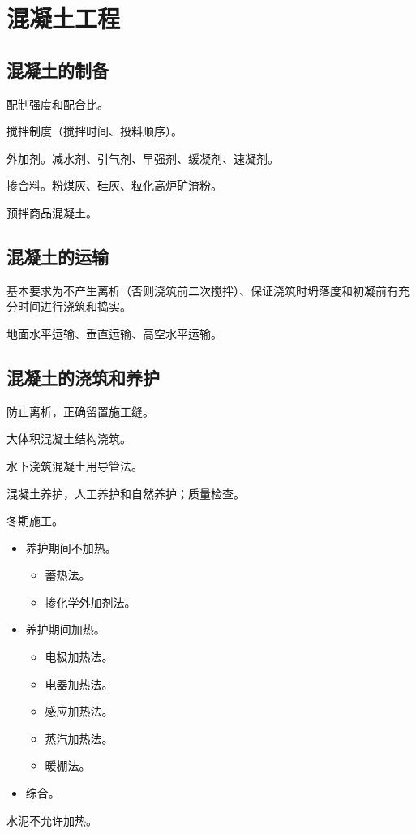 \documentclass{book}
\begin{document}
\section{混凝土工程}
\subsection{混凝土的制备}
\par 配制强度和配合比。
\par 搅拌制度（搅拌时间、投料顺序）。
\par 外加剂。减水剂、引气剂、早强剂、缓凝剂、速凝剂。
\par 掺合料。粉煤灰、硅灰、粒化高炉矿渣粉。
\par 预拌商品混凝土。
\subsection{混凝土的运输}
\par 基本要求为不产生离析（否则浇筑前二次搅拌）、保证浇筑时坍落度和初凝前有充分时间进行浇筑和捣实。
\par 地面水平运输、垂直运输、高空水平运输。
\subsection{混凝土的浇筑和养护}
\par 防止离析，正确留置施工缝。
\par 大体积混凝土结构浇筑。
\par 水下浇筑混凝土用导管法。
\par 混凝土养护，人工养护和自然养护；质量检查。
\par 冬期施工。
\begin{itemize}
    \item 养护期间不加热。
          \begin{itemize}
              \item 蓄热法。
              \item 掺化学外加剂法。
          \end{itemize}
    \item 养护期间加热。
          \begin{itemize}
              \item 电极加热法。
              \item 电器加热法。
              \item 感应加热法。
              \item 蒸汽加热法。
              \item 暖棚法。
          \end{itemize}
    \item 综合。
\end{itemize}
\par 水泥不允许加热。
\end{document}
